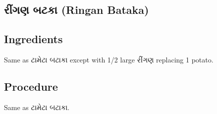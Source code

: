 \documentclass[../../recipes.tex]{subfiles}
\begin{document}
\begin{gujarati}

\chapter{રીંગણ બટકા (Ringan Bataka)}

\section*{Ingredients}

Same as ટામેટા બટાકા except with 1/2 large રીંગણ replacing 1 potato.

\noindent
\section*{Procedure}

Same as ટામેટા બટાકા.

\end{gujarati}
\end{document}
